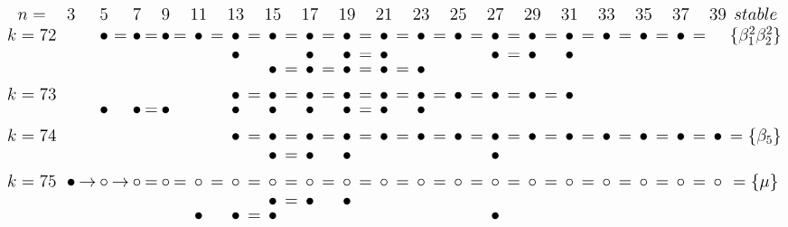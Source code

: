 \documentclass{article}
\begin{document}
\(
\begin{tikzcd}[
nodes={font=\Large,inner sep=0pt},
row sep=0.2cm,
column sep=0.1cm
]
n= && & 3 & & 5 & & 7 & & 9 & & 11 & & 13 & & 15 & & 17 && 19 && 21 && 23 && 25 && 27 && 29 && 31 && 33 && 35 && 37 && 39 & stable \\
k=72 &&& && \bullet &=& \bullet &=& \bullet &=& \bullet &=& \bullet &=& \bullet &=& \bullet &=& \bullet &=& \bullet &=& \bullet &=& \bullet &=& \bullet &=& \bullet &=& \bullet &=& \bullet &=& \bullet &=& \bullet &=&  & \{\beta_1^2\beta_2^2\} \\
&&& && && && && && \bullet && && \bullet && \bullet &=& \bullet && && && \bullet &=& \bullet && \bullet && \\
&&& && && && && && && \bullet &=& \bullet &=& \bullet &=& \bullet &=& \bullet && && && \\ \\
k=73 &&& && && && && && \bullet &=& \bullet &=& \bullet &=& \bullet &=& \bullet &=& \bullet &=& \bullet &=& \bullet &=& \bullet &=& \bullet  \\
&&& && \bullet && \bullet &=& \bullet && && \bullet && \bullet && \bullet && \bullet &=& \bullet && \bullet && && && \\ \\
k=74 &&& && && && && && \bullet &=& \bullet &=& \bullet &=& \bullet &=& \bullet &=& \bullet &=& \bullet &=& \bullet &=& \bullet &=& \bullet &=& \bullet &=& \bullet &=& \bullet &=& \bullet & = \{\beta_5\} \\
&&& && && && && && && \bullet &=& \bullet && \bullet && && && && \bullet && \\ \\
k=75 &&& \bullet &\rightarrow& \circ &\rightarrow& \circ &=& \circ &=& \circ &=& \circ &=& \circ &=& \circ &=& \circ &=& \circ &=& \circ &=& \circ &=& \circ &=& \circ &=& \circ &=& \circ &=& \circ &=& \circ &=& \circ & = \{\mu\} \\
&&& && && && && && && \bullet &=& \bullet && \bullet \\
&&& && && && && \bullet && \bullet &=& \bullet && && && && && && \bullet \\
\\
\end{tikzcd}
\)
\end{document}
